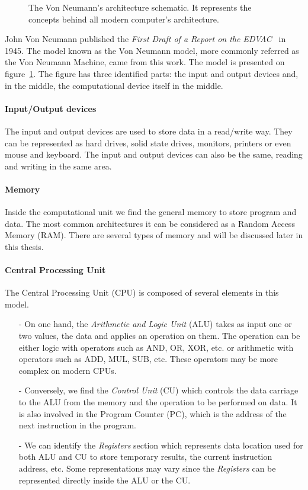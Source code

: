 \begin{figure}
\centering 

\caption{The Von Neumann's architecture schematic. It represents the concepts behind all modern computer's architecture. }
\label{fig:1_HPC:von_neumann_model}
\end{figure}

John Von Neumann published the \textit{First Draft of a Report on the EDVAC}~\cite{von1993first} in 1945. 
The model known as the Von Neumann model, more commonly referred as the Von Neumann Machine, came from this work.
The model is presented on figure~\ref{fig:1_HPC:von_neumann_model}.
The figure has three identified parts: the input and output devices and, in the middle, the computational device itself in the middle. 
\paragraph{Input/Output devices}
The input and output devices are used to store data in a read/write way. 
They can be represented as hard drives, solid state drives, monitors, printers or even mouse and keyboard.
The input and output devices can also be the same, reading and writing in the same area.\\

\paragraph{Memory} 
Inside the computational unit we find the general memory to store program and data. 
The most common architectures it can be considered as a Random Access Memory (RAM). 
There are several types of memory and will be discussed later in this thesis. 

\paragraph{Central Processing Unit}
The Central Processing Unit (CPU) is composed of several elements in this model. 
\begin{itemize}[noitemsep,nolistsep]
\item[-] On one hand, the \textit{Arithmetic and Logic Unit} (ALU) takes as input one or two values, the data and applies an operation on them. 
The operation can be either logic with operators such as AND, OR, XOR, etc. or arithmetic with operators such as ADD, MUL, SUB, etc. 
These operators may be more complex on modern CPUs. 
\item[-] Conversely, we find the \textit{Control Unit} (CU) which controls the data carriage to the ALU from the memory and the operation to be performed on data.
It is also involved in the Program Counter (PC), which is the address of the next instruction in the program. 
\item[-] We can identify the \textit{Registers} section which represents data location used for both ALU and CU to store temporary results, the current instruction address, etc. 
Some representations may vary since the \textit{Registers} can be represented directly inside the ALU or the CU. 
\end{itemize}
